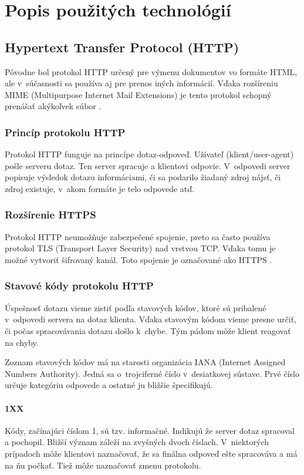 \documentclass[slovak]{fitthesis}
\begin{document}
\chapter{Popis použitých technológií}\label{technologie}


\section{Hypertext Transfer Protocol (HTTP)}\label{http}
Pôvodne bol protokol HTTP určený pre výmenu dokumentov vo formáte HTML, ale v~súčasnosti sa používa aj pre prenos iných informácií. Vďaka rozšíreniu MIME (Multipurpose Internet Mail Extensions) je tento protokol schopný prenášať akýkoľvek súbor \cite{httpRFC}.

\subsection{Princíp protokolu HTTP}
Protokol HTTP funguje na princípe dotaz-odpoveď. Užívateľ (klient/user-agent) pošle serveru dotaz. Ten server spracuje a klientovi odpovie. V~odpovedi server popisuje výsledok dotazu informáciami, či sa podarilo žiadaný zdroj nájsť, či zdroj existuje, v~akom formáte je telo odpovede atď.


\subsection{Rozšírenie HTTPS}
Protokol HTTP neumožňuje zabezpečené spojenie, preto sa často používa protokol TLS (Transport Layer Security) nad vrstvou TCP. Vďaka tomu je možné vytvoriť šifrovaný kanál. Toto spojenie je označované ako HTTPS \cite{httpsRFC}.


\subsection{Stavové kódy protokolu HTTP}
Úspešnosť dotazu vieme zistiť podľa stavových kódov, ktoré sú pribalené v~odpovedi servera na dotaz klienta. Vďaka stavovým kódom vieme presne určiť, či počas spracovávania dotazu došlo k~chybe. Tým pádom môže klient reagovať na chyby.

Zoznam stavových kódov má na starosti organizácia IANA (Internet Assigned Numbers Authority). Jedná sa o~trojciferné číslo v~desiatkovej sústave. Prvé číslo určuje kategóriu odpovede a ostatné ju bližšie špecifikujú\cite{shiflett2003http}.

\subsubsection{1XX}
Kódy, začínajúci číslom 1, sú tzv. informačné. Indikujú že server dotaz spracoval a pochopil. Bližší význam záleží na zvyšných dvoch číslach. V~niektorých prípadoch môže klientovi naznačovať, že sa finálna odpoveď ešte spracováva a má na ňu počkať. Tiež môže naznačovať zmenu protokolu.
\end{document}
